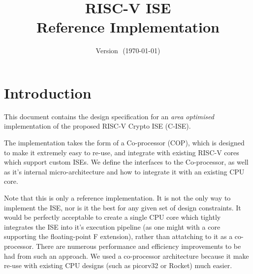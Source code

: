 \documentclass{article}
\title{RISC-V \XCID ISE \\ Reference Implementation}
\author{}
\date{Version $$ (\today)}
\begin{document}
\maketitle \tableofcontents



\newcommand{\SIGNALS}[3]{
\begin{table}[H]
\begin{tabularx}{\textwidth}{@{} c c l Y @{}}
\toprule
\textbf{I/O} & \textbf{Size} & \textbf{Name} & \textbf{Description} \\
\midrule
#1
\bottomrule
\end{tabularx}
\caption{#2}
\label{#3}
\end{table}
}

\newcommand{\SIGREF}[1]{{\tt #1}}

\newcommand{\SIGNALI}[3]{
    {\bf I} & $#1$ &{\tt #2}& #3 \\ \addlinespace
}

\newcommand{\SIGNALO}[3]{
    {\bf O} & $#1$ &{\tt #2}& #3 \\ \addlinespace
}

\newcommand{\cpucopif}{\nameref{sec:cpu-cop-if} }


\section{Introduction}

This document contains the design specification for an {\em area optimised}
implementation of the proposed RISC-V Crypto ISE (C-ISE).

The implementation takes the form of a Co-processor (COP), which is designed
to make it extremely easy to re-use, and integrate with existing RISC-V cores
which support custom ISEs. We define the interfaces to the Co-processor, as
well as it's internal micro-architecture and how to integrate it with an
existing CPU core.

Note that this is only a reference implementation. It is not the only way
to implement the ISE, nor is it the best for any given set of design
constraints. It would be perfectly acceptable to create a single CPU core
which tightly integrates the ISE into it's execution pipeline (as one might
with a core supporting the floating-point F extension), rather than
attatching to it as a co-processor. There are numerous performance and
efficiency improvements to be had from such an approach. We used a
co-processor architecture because it make re-use with existing CPU designs
(such as picorv32 or Rocket) much easier.
\end{document}
